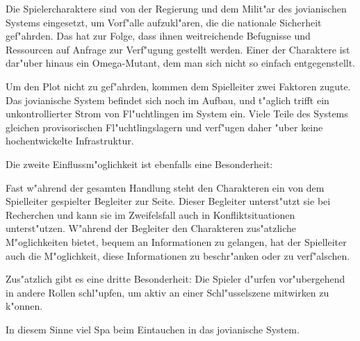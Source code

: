 Die Spielercharaktere sind von der Regierung und dem Milit"ar des jovianischen Systems eingesetzt, um Vorf"alle aufzukl"aren, die die nationale Sicherheit gef"ahrden. Das hat zur Folge, dass ihnen weitreichende Befugnisse und Ressourcen auf Anfrage zur Verf"ugung gestellt werden. Einer der Charaktere ist dar"uber hinaus ein Omega-Mutant, dem man sich nicht so einfach entgegenstellt.

Um den Plot nicht zu gef"ahrden, kommen dem Spielleiter zwei Faktoren zugute. Das jovianische System befindet sich noch im Aufbau, und t"aglich trifft ein unkontrollierter Strom von Fl"uchtlingen im System ein. Viele Teile des Systems gleichen provisorischen Fl"uchtlingslagern und verf"ugen daher "uber keine hochentwickelte Infrastruktur.

Die zweite Einflussm"oglichkeit ist ebenfalls eine Besonderheit:

Fast w"ahrend der gesamten Handlung steht den Charakteren ein von dem Spielleiter gespielter Begleiter zur Seite. Dieser Begleiter unterst"utzt sie bei Recherchen und kann sie im Zweifelsfall auch in Konfliktsituationen unterst"utzen. W"ahrend der Begleiter den Charakteren zus"atzliche M"oglichkeiten bietet, bequem an Informationen zu gelangen, hat der Spielleiter auch die M"oglichkeit, diese Informationen zu beschr"anken oder zu verf"alschen.

Zus"atzlich gibt es eine dritte Besonderheit: Die Spieler d"urfen vor"ubergehend in andere Rollen schl"upfen, um aktiv an einer Schl"usselszene mitwirken zu k"onnen.

\vspace{1.5cm}
\begin{center}{\large{}In diesem Sinne viel Spa\3 beim Eintauchen in das jovianische System.}\end{center}
